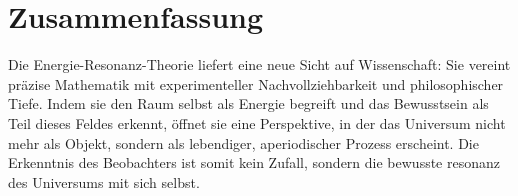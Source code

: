 \section{Zusammenfassung}
\label{sec:zusammenfassung9}
Die Energie-Resonanz-Theorie liefert eine neue Sicht auf Wissenschaft: 
Sie vereint präzise Mathematik mit experimenteller Nachvollziehbarkeit und philosophischer Tiefe. 
Indem sie den Raum selbst als Energie begreift und das Bewusstsein als Teil dieses Feldes erkennt, 
öffnet sie eine Perspektive, in der das Universum nicht mehr als Objekt, 
sondern als lebendiger, aperiodischer Prozess erscheint. 
Die Erkenntnis des Beobachters ist somit kein Zufall, 
sondern die bewusste \gls{resonanz} des Universums mit sich selbst.

